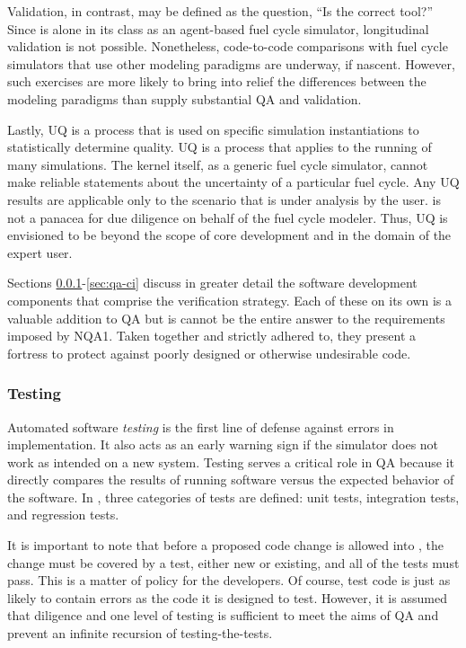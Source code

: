 Validation, in contrast,  may be defined as the question,
``Is \Cyclus the correct tool?''
Since \Cyclus is alone in its class as an agent-based fuel cycle simulator, longitudinal
validation is not possible. Nonetheless, code-to-code comparisons with fuel cycle
simulators that use other modeling paradigms are underway, if nascent. However, such
exercises are more likely to bring into relief the differences between the modeling
paradigms than supply substantial \gls{QA} and validation.

Lastly, \gls{UQ} is a process that is used on specific simulation
instantiations to statistically determine quality. \gls{UQ} is a process that applies
to the running of many \Cyclus simulations. The kernel itself, as a generic fuel cycle
simulator, cannot make reliable statements about the uncertainty of a particular fuel
cycle. Any \gls{UQ} results are applicable only to the scenario that is under
analysis by the user. \Cyclus is not a panacea for due diligence on behalf of the fuel
cycle modeler. Thus, \gls{UQ} is envisioned to be beyond the scope of core development
and in the domain of the expert user.

Sections \ref{sec:qa-testing}-\ref{sec:qa-ci} discuss in greater detail the software
development components that comprise the \Cyclus verification strategy.
Each of these on its own is a valuable addition to \gls{QA} but is cannot be the
entire answer to the requirements imposed by \gls{NQA1}. Taken together and strictly
adhered to, they present a fortress to protect against poorly designed or otherwise undesirable code.


\subsubsection{Testing}
\label{sec:qa-testing}

Automated software \emph{testing} is the first line of defense against
errors in implementation. It also acts as an early warning sign if the
simulator does not work as intended on a new system.
Testing serves a critical role in \gls{QA} because it directly compares the
results of running software versus the expected behavior of the software.
In \Cyclus, three categories of tests are defined: unit tests, integration
tests, and regression tests.

It is important to note that before a proposed
code change is allowed into \Cyclus,  the change must be covered by a test, either new or existing, and all of the tests must pass.  This is a
matter of policy for the developers. Of course, test code is
just as likely to contain errors as the code it is designed to test.
However, it is assumed that diligence and one level of testing
is sufficient to meet the aims of \gls{QA} and prevent an infinite recursion
of testing-the-tests.

